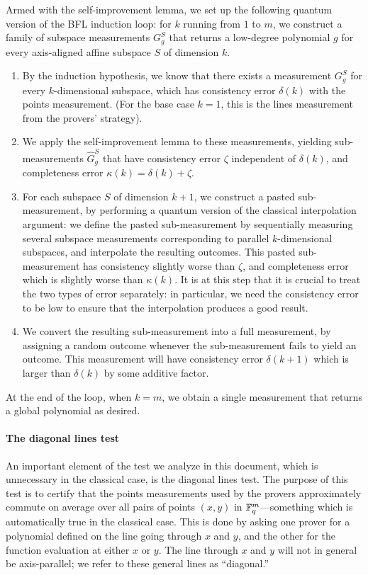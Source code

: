 Armed with the self-improvement lemma, we set up the following
quantum version of the BFL
induction loop: for $k$ running from $1$ to $m$, we construct a family
of subspace measurements $G^{S}_{g}$ that returns a low-degree
polynomial $g$ for every axis-aligned affine subspace $S$ of dimension $k$.
\begin{enumerate}
  \item By the induction hypothesis, we know that there exists a
    measurement  $G^{S}_{g}$ for every $k$-dimensional subspace, which
    has consistency error $\delta(k)$ with the points
    measurement. (For the base case $k = 1$, this is the lines
    measurement from the provers' strategy). 
  \item We apply the self-improvement lemma to these measurements, yielding
    sub-measurements $\hat{G}^{S}_{g}$ that have consistency error
    $\zeta$ independent of $\delta(k)$, and completeness error $\kappa(k) = \delta(k) + \zeta$.
  \item For each subspace $S$ of dimension $k+1$, we construct a
    pasted sub-measurement, by performing a quantum version of the
    classical interpolation argument: we define the pasted
    sub-measurement by sequentially measuring several subspace
    measurements corresponding to parallel $k$-dimensional subspaces,
    and interpolate the resulting outcomes. This pasted sub- measurement has consistency slightly worse than $\zeta$, and completeness error which
    is slightly worse than $\kappa(k)$. It is at this step that it is crucial to treat the two types
    of error separately: in particular, we need the consistency error
    to be low to ensure that the interpolation produces a good result.
  \item We convert the resulting sub-measurement into a full
    measurement, by assigning a random outcome whenever the
    sub-measurement fails to yield an outcome. This measurement will
    have consistency error $\delta(k+1)$ which is larger than $\delta(k)$
    by some additive factor.
  \end{enumerate}
  At the end of the loop, when $k = m$, we obtain a single measurement that returns
  a global polynomial as desired.
\paragraph{The diagonal lines test}
An important element of the test we analyze in this document, which is
unnecessary in the classical case, is the diagonal lines test. The purpose
of this test is to certify that the points measurements used by the provers
approximately commute on average over all pairs of points $(x, y)$ in
$\mathbb F_q^m$---something which is automatically true in the classical case. This is done by asking one prover for a polynomial defined
on the line going through $x$ and $y$, and the other for the function
evaluation at either $x$ or $y$. The line through $x$ and
$y$ will not in general be axis-parallel; we refer to these general
lines as ``diagonal.''

